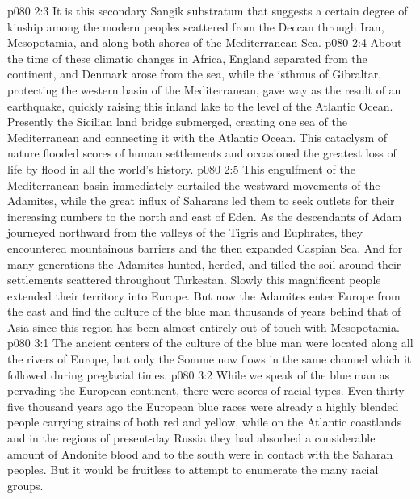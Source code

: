 \vs p080 2:3 It is this secondary Sangik substratum that suggests a certain degree of kinship among the modern peoples scattered from the Deccan through Iran, Mesopotamia, and along both shores of the Mediterranean Sea.
\vs p080 2:4 \pc About the time of these climatic changes in Africa, England separated from the continent, and Denmark arose from the sea, while the isthmus of Gibraltar, protecting the western basin of the Mediterranean, gave way as the result of an earthquake, quickly raising this inland lake to the level of the Atlantic Ocean. Presently the Sicilian land bridge submerged, creating one sea of the Mediterranean and connecting it with the Atlantic Ocean. This cataclysm of nature flooded scores of human settlements and occasioned the greatest loss of life by flood in all the world’s history.
\vs p080 2:5 This engulfment of the Mediterranean basin immediately curtailed the westward movements of the Adamites, while the great influx of Saharans led them to seek outlets for their increasing numbers to the north and east of Eden. As the descendants of Adam journeyed northward from the valleys of the Tigris and Euphrates, they encountered mountainous barriers and the then expanded Caspian Sea. And for many generations the Adamites hunted, herded, and tilled the soil around their settlements scattered throughout Turkestan. Slowly this magnificent people extended their territory into Europe. But now the Adamites enter Europe from the east and find the culture of the blue man thousands of years behind that of Asia since this region has been almost entirely out of touch with Mesopotamia.
\vs p080 3:1 The ancient centers of the culture of the blue man were located along all the rivers of Europe, but only the Somme now flows in the same channel which it followed during preglacial times.
\vs p080 3:2 While we speak of the blue man as pervading the European continent, there were scores of racial types. Even thirty\hyp{}five thousand years ago the European blue races were already a highly blended people carrying strains of both red and yellow, while on the Atlantic coastlands and in the regions of present\hyp{}day Russia they had absorbed a considerable amount of Andonite blood and to the south were in contact with the Saharan peoples. But it would be fruitless to attempt to enumerate the many racial groups.

